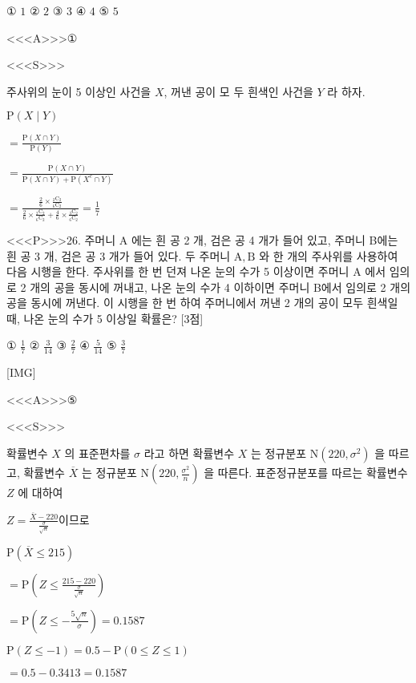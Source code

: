 \documentclass{oblivoir}
\begin{document}
① $1$
② $2$
③ $3$
④ $4$
⑤ $5$

<<<A>>>①

<<<S>>>



주사위의 눈이 5 이상인 사건을 $X$, 꺼낸 공이 모 두 흰색인 사건을 $Y$ 라 하자.

$\mathrm{P}(X \mid Y) $

$=\frac{\mathrm{P}(X \cap Y)}{\mathrm{P}(Y)}$

$=\frac{\mathrm{P}(X \cap Y)}{\mathrm{P}(X \cap Y)+\mathrm{P}\left(X^{c} \cap Y\right)}$

$=\frac{\frac{2}{6} \times \frac{{ }_{2} \mathrm{C}_{2}}{{ }_{6} \mathrm{C}_{2}}}{\frac{2}{6} \times \frac{{ }_{2} \mathrm{C}_{2}}{{ }_{6} \mathrm{C}_{2}}+\frac{4}{6} \times \frac{{ }_{3} \mathrm{C}_{2}}{{ }_{6} \mathrm{C}_{2}}}=\frac{1}{7}$


<<<P>>>26. 주머니 $\mathrm{A}$ 에는 흰 공 2 개, 검은 공 4 개가 들어 있고, 주머니 B에는 흰 공 3 개, 검은 공 3 개가 들어 있다.
두 주머니 $\mathrm{A}, \mathrm{B}$ 와 한 개의 주사위를 사용하여 다음 시행을 한다.
주사위를 한 번 던져
나온 눈의 수가 5 이상이면
주머니 $\mathrm{A}$ 에서 임의로 2 개의 공을 동시에 꺼내고,
나온 눈의 수가 4 이하이면
주머니 B에서 임의로 2 개의 공을 동시에 꺼낸다.
이 시행을 한 번 하여 주머니에서 꺼낸 2 개의 공이 모두 흰색일 때, 나온 눈의 수가 5 이상일 확률은? [3점]

① $\frac{1}{7}$
② $\frac{3}{14}$
③ $\frac{2}{7}$
④ $\frac{5}{14}$
⑤ $\frac{3}{7}$

[IMG]

<<<A>>>⑤

<<<S>>>



확률변수 $X$ 의 표준편차를 $\sigma$ 라고 하면
확률변수 $X$ 는 정규분포 $\mathrm{N}\left(220, \sigma^{2}\right)$ 을 따르고,
확률변수 $\overline{X}$ 는 정규분포 $\mathrm{N}\left(220, \frac{\sigma^{2}}{n}\right)$ 을 따른다.
표준정규분포를 따르는 확률변수 $Z$ 에 대하여

$Z=\frac{\overline{X}-220}{\frac{\sigma}{\sqrt{n}}}$이므로

$\mathrm{P}(\overline{X} \leq 215) $

$=\mathrm{P}\left(Z \leq \frac{215-220}{\frac{\sigma}{\sqrt{n}}}\right)$

$=\mathrm{P}\left(Z \leq-\frac{5 \sqrt{n}}{\sigma}\right)=0.1587$

$\mathrm{P}(Z \leq-1)=0.5-\mathrm{P}(0 \leq Z \leq 1)$

$= 0.5-0.3413=0.1587$
\end{document}
